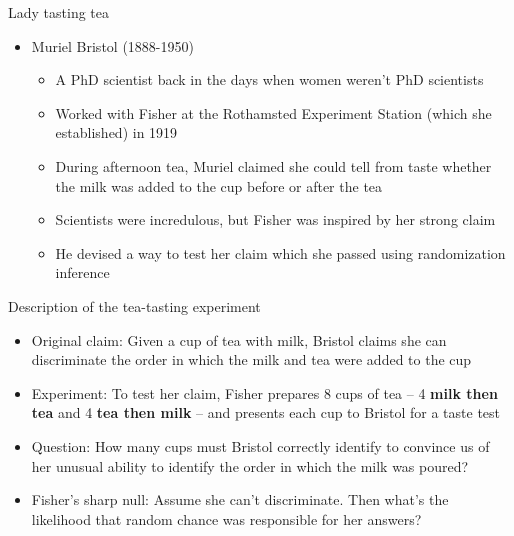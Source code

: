 \documentclass{beamer}
\begin{document}
\begin{frame}{Lady tasting tea}

\begin{itemize}
	\item Muriel Bristol (1888-1950)
		\begin{itemize}
		\item A PhD scientist back in the days when women weren't PhD scientists
		\item Worked with Fisher at the Rothamsted Experiment Station (which she established) in 1919 
		\item During afternoon tea, Muriel claimed she could tell from taste whether the milk was added to the cup before or after the tea
		\item Scientists were incredulous, but Fisher was inspired by her strong claim
		\item He devised a way to test her claim which she passed using randomization inference
		\end{itemize}
\end{itemize}

\end{frame}

\begin{frame}{Description of the tea-tasting experiment}

	\begin{itemize}
	\item Original claim: Given a cup of tea with milk, Bristol claims she can discriminate the order in which the milk and tea were added to the cup
	\item Experiment: To test her claim, Fisher prepares 8 cups of tea -- 4 \textbf{milk then tea} and 4 \textbf{tea then milk} -- and presents each cup to Bristol for a taste test
	\item Question: How many cups must Bristol correctly identify to convince us of her unusual ability to identify the order in which the milk was poured?
	\item Fisher's sharp null: Assume she can't discriminate.  Then what's the likelihood that random chance was responsible for her answers?
	\end{itemize}
\end{frame}
\end{document}
